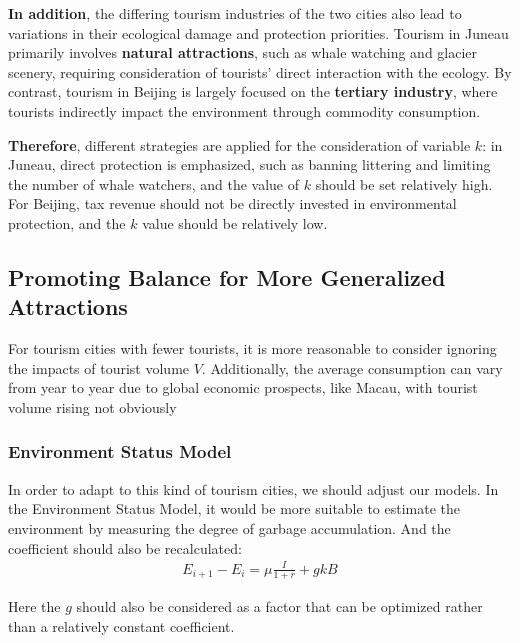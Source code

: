 \documentclass[UTF8]{mcmthesis}
\begin{document}
    \textbf{In addition}, the differing tourism industries of the two cities also lead to variations in their ecological damage and protection priorities. Tourism in Juneau primarily involves \textbf{natural attractions}, such as whale watching and glacier scenery, requiring consideration of tourists' direct interaction with the ecology. By contrast, tourism in Beijing is largely focused on the \textbf{tertiary industry}, where tourists indirectly impact the environment through commodity consumption. 
                
\textbf{Therefore}, different strategies are applied for the consideration of variable \(k\): in Juneau, direct protection is emphasized, such as banning littering and limiting the number of whale watchers, and the value of \(k\) should be set relatively high. For Beijing, tax revenue should not be directly invested in environmental protection, and the \(k\) value should be relatively low.
                
            \subsection{Promoting Balance for More Generalized Attractions
            }
            
            
            For tourism cities with fewer tourists, it is more reasonable to consider ignoring the impacts of tourist volume $V$. Additionally, the average consumption can vary from year to year due to global economic prospects, like Macau, with tourist volume rising not obviously 
            
            \subsubsection{Environment Status Model}
            In order to adapt to this kind of tourism cities, we should adjust our models. In the Environment Status Model, it would be more suitable to estimate the environment by measuring the degree of garbage accumulation. And the coefficient should also be recalculated:
            \begin{equation}
            	\begin{aligned}
            		{E_{i+1}} -E_{i} = \mu \frac{I}{1+r} + gkB
            	\end{aligned}
            \end{equation}
            
            Here the \( g \) should also be considered as a factor that can be optimized rather than a relatively constant coefficient.
            
\end{document}
